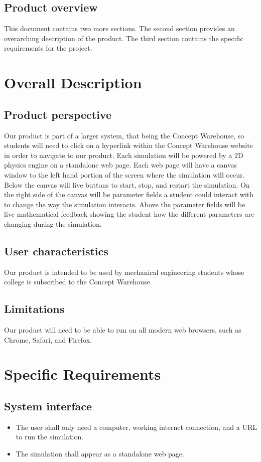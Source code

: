 \documentclass[onecolumn, draftclsnofoot,10pt, compsoc]{IEEEtran}
\begin{document}
\subsection{Product overview}
This document contains two more sections. The second section provides an overarching description of the product. The third section contains the specific requirements for the project.
\section{Overall Description}
\subsection{Product perspective}
Our product is part of a larger system, that being the Concept Warehouse, so students will need to click on a hyperlink within the Concept Warehouse website in order to navigate to our product. Each simulation will be powered by a 2D physics engine on a standalone web page. Each web page will have a canvas window to the left hand portion of the screen where the simulation will occur. Below the canvas will live buttons to start, stop, and restart the simulation. On the right side of the canvas will be parameter fields a student could interact with to change the way the simulation interacts. Above the parameter fields will be live mathematical feedback showing the student how the different parameters are changing during the simulation.
\subsection{User characteristics}
Our product is intended to be used by mechanical engineering students whose college is subscribed to the Concept Warehouse.
\subsection{Limitations}
Our product will need to be able to run on all modern web browsers, such as Chrome, Safari, and Firefox. 
\section{Specific Requirements}
\subsection{System interface}
\begin{itemize}
\item The user shall only need a computer, working internet connection, and a URL to run the simulation.
\item The simulation shall appear as a standalone web page.
\end{itemize}
\end{document}
